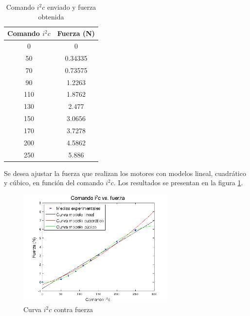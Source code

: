 \documentclass[spanish,12pt,a4paper,titlepage]{report}
\begin{document}
\begin{table}[H]
\centering
\begin{tabular}{|c|c|} 
	\hline
	\cellcolor[gray]{0.8} \textbf{Comando $i^2c$} & 
	\cellcolor[gray]{0.8} \textbf{Fuerza (N)} \\ \hline \hline
	  0 &      0 \\ \hline
	 50 &0.34335 \\ \hline
	 70 &0.73575 \\ \hline
	 90 & 1.2263 \\ \hline
	110 & 1.8762 \\ \hline
	130 &  2.477 \\ \hline
	150 & 3.0656 \\ \hline
	170 & 3.7278 \\ \hline
	200 & 4.5862 \\ \hline
	250 &  5.886 \\ \hline
\end{tabular}
\caption{Comando $i^2c$ enviado y fuerza obtenida}
\label{tab:if}
\end{table}

Se desea ajustar la fuerza que realizan los motores con modelos lineal, cuadrático y cúbico, en función del comando $i^2c$. Los resultados se presentan en la figura \ref{fig:if}.

\begin{figure}[h!]
  \begin{center}
	\includegraphics[width=0.7\textwidth]{./Pics/if.png}
  \end{center}
  \caption{Curva $i^2c$ contra fuerza}
  \label{fig:if}
\end{figure}
\end{document}
